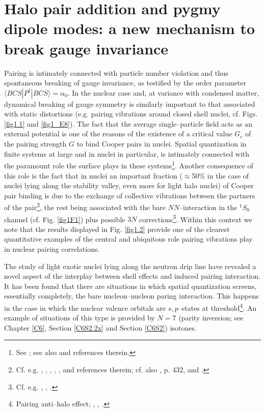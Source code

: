 \section[Halo pair addition mode and pygmy]{Halo pair addition and pygmy dipole modes: a new mechanism to break gauge invariance}\label{App1AF}
Pairing is intimately connected with particle number violation and thus spontaneous breaking of gauge invariance, as testified by the order parameter\\ \mbox{$\langle BCS|P^{\dagger}|BCS\rangle=\alpha_0$}.  In the nuclear case and, at variance with condensed matter, dynamical breaking of gauge symmetry is similarly important to that associated with static distortions (e.g. pairing vibrations around closed shell nuclei, cf. Figs. \ref{fig1.1} and \ref{fig1_E8}). The fact that the average single--particle field acts as an external potential  is one of the reasons of the existence of a critical value $G_c$ of the pairing strength $G$ to bind Cooper pairs in nuclei. Spatial quantization in finite systems at large and in nuclei in particular, is intimately connected with the paramount role the surface plays in these systems\footnote{See \cite{Bohr:75}; see also \cite{Broglia:02d} and references therein.}. Another consequence of this role is  the fact that in nuclei an important fraction ($\approx$50\% in the case of nuclei lying along the stability valley, even more for light halo nuclei) of Cooper pair binding is due to the exchange of collective vibrations between the partners of the pair\footnote{Cf. e.g. \cite{Barranco:99}, \cite{Brink:05}, \cite{Saperstein:12}, \cite{Avdenkov:12}, \cite{Lombardo:12}, and references therein; cf. also \cite{Bohr:75}, p. 432, \cite{Barranco:01} and \cite{Potel:10}.}, the rest being associated with the bare $NN$--interaction in the $^1S_0$ channel (cf. Fig. \ref{fig1F1}) plus possible $3N$ corrections\footnote{Cf. e.g. \cite{Lesinski:12}, \cite{Pankratov:11}, \cite{Hergert:09}.}. Within this context we note that the results displayed in Fig. \ref{fig1.2} provide one of the clearest quantitative examples of the central and ubiquitous role pairing vibrations play in nuclear pairing correlations.


The study of light exotic nuclei lying along the neutron drip line have revealed a novel aspect of the interplay between shell effects and induced pairing interaction. It has been found  that there are situations in which spatial quantization screens, essentially completely, the bare nucleon--nucleon paring interaction. This happens in the case in which the nuclear valence orbitals are $s,p$--states at threshold\footnote{Pairing anti--halo effect; \cite{Bennaceur:00} 
, \cite{Hamamoto:03}, \cite{Hamamoto:04}.}. An example of situations of this type is provided by $N=7$ (parity inversion; see Chapter \ref{C6}, Section \ref{C6S2.2x} and Section \ref{C6S2}) isotones.


